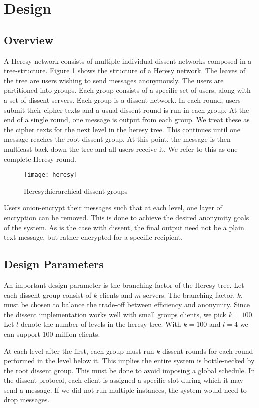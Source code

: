 \section{Design}
\subsection{Overview}
A Heresy network consists of multiple individual dissent networks composed in a tree-structure. Figure \ref{fig:heresy} shows the structure of a Heresy network. The leaves of the tree are users wishing to send messages anonymously. The users are partitioned into groups. Each group consists of a specific set of users, along with a set of dissent servers. Each group is a dissent network. In each round, users submit their cipher texts and a usual dissent round is run in each group. At the end of a single round, one message is output from each group. We treat these as the cipher texts for the next level in the heresy tree. This continues until one message reaches the root dissent group. At this point, the message is then multicast back down the tree and all users receive it. We refer to this as one complete Heresy round.

\begin{figure}
\centering
\texttt{[image: heresy]}
\caption{Heresy:hierarchical dissent groups}
\label{fig:heresy}
\end{figure}

Users onion-encrypt their messages such that at each level, one layer of encryption can be removed. This is done to achieve the desired anonymity goals of the system. As is the case with dissent, the final output need not be a plain text message, but rather encrypted for a specific recipient.

\subsection{Design Parameters}

An important design parameter is the branching factor of the Heresy tree. Let each dissent group consist of $k$ clients and $m$ servers. The branching factor, $k$, must be chosen to balance the trade-off between efficiency and anonymity. Since the dissent implementation works well with small groups clients, we pick $k=100$. Let $l$ denote the number of levels in the heresy tree. With $k=100$ and $l=4$ we can support 100 million clients.

At each level after the first, each group must run $k$ dissent rounds for each round performed in the level below it. This implies the entire system is bottle-necked by the root dissent group. This must be done to avoid imposing a global schedule. In the dissent protocol, each client is assigned a specific slot during which it may send a message. If we did not run multiple instances, the system would need to drop messages. 


